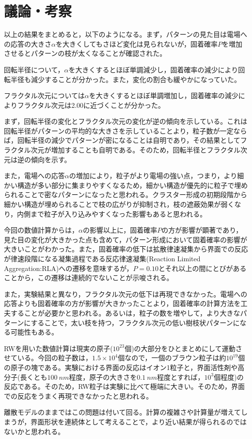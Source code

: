 \documentclass[autodetect-engine,dvi=dvipdfmx,a4paper,ja=standard,oneside,openany,11pt,draft]{bxjsbook}
\begin{document}
\section{議論・考察}
以上の結果をまとめると，以下のようになる。まず，パターンの見た目は電場への応答の大きさ$\alpha$を大きくしてもさほど変化は見られないが，固着確率$P$を増加させるとパターンの枝が太くなることが確認された。

回転半径について，$\alpha$を大きくするとほぼ単調減少し，固着確率の減少により回転半径も減少することが分かった。また，変化の割合も緩やかになっていた。

フラクタル次元については$\alpha$を大きくするとほぼ単調増加し，固着確率の減少によりフラクタル次元は2.00に近づくことが分かった。

まず，回転半径の変化とフラクタル次元の変化が逆の傾向を示している。これは回転半径がパターンの平均的な大きさを示していることより，粒子数が一定ならば，回転半径の減少でパターンが密になることは自明であり，その結果としてフラクタル次元が増加することも自明である。そのため，回転半径とフラクタル次元は逆の傾向を示す。

また，電場への応答$\alpha$の増加により，粒子がより電場の強い点，つまり，より細かい構造が多い部分に集まりやすくなるため，細かい構造が優先的に粒子で埋められることで密なパターンになったと思われる。クラスター形成の初期段階から細かい構造が埋められることで枝の広がりが抑制され，枝の遮蔽効果が弱くなり，内側まで粒子が入り込みやすくなった影響もあると思われる。

今回の数値計算からは，$\alpha$の影響以上に，固着確率$P$の方が影響が顕著であり，見た目の変化が大きかった点も含めて，パターン形成において固着確率の影響が大きいことがわかった。また，固着確率の低下は拡散律速凝集から界面での反応が律速段階になる凝集過程である反応律速凝集(Reaction Limited Aggregation:RLA)への遷移を意味するが，$P=0.10$とそれ以上の間にとびがあることから，この遷移は連続的でないことが示唆される。

また，実験結果と異なり，フラクタル次元の低下は再現できなかった。電場への応答よりも固着確率の方が影響が大きかったことより，固着確率の計算方法を工夫することが必要かと思われる。あるいは，粒子の数を増やして，より大きなパターンにすることで，太い枝を持つ，フラクタル次元の低い樹枝状パターンになる可能性もある。

RWを用いた数値計算は現実の原子($10^{23}$個)の大部分をひとまとめにして運動させている。今回の粒子数は，$1.5\times10^4$個なので，一個のブラウン粒子は約$10^{19}$個の原子の塊である。実験における界面の反応はイオン1粒子と，界面活性剤や高分子(長くとも$\SI{100}{nm}$程度，原子の大きさを$\SI{0.1}{nm}$程度とすれば，$10^3$個程度)の反応である。そのため，RW粒子は実験に比べて極端に大きい。そのため，界面での反応をうまく再現できなかったと思われる。

離散モデルのままではこの問題は付いて回る。計算の複雑さや計算量が増えてしまうが，界面形状を連続体として考えることで，より近い結果が得られるのではないかと思われる。

\ifdraft{
  
  
}{}
\end{document}
